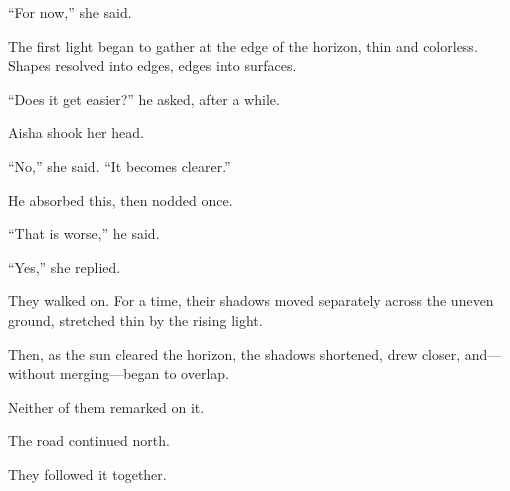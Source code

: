 ``For now,'' she said.

The first light began to gather at the edge of the horizon, thin and colorless. Shapes
resolved into edges, edges into surfaces.

``Does it get easier?'' he asked, after a while.

Aisha shook her head.

``No,'' she said. ``It becomes clearer.''

He absorbed this, then nodded once.

``That is worse,'' he said.

``Yes,'' she replied.

They walked on. For a time, their shadows moved separately across the uneven ground,
stretched thin by the rising light.

Then, as the sun cleared the horizon, the shadows shortened, drew closer, and---without
merging---began to overlap.

Neither of them remarked on it.

The road continued north.

They followed it together.
